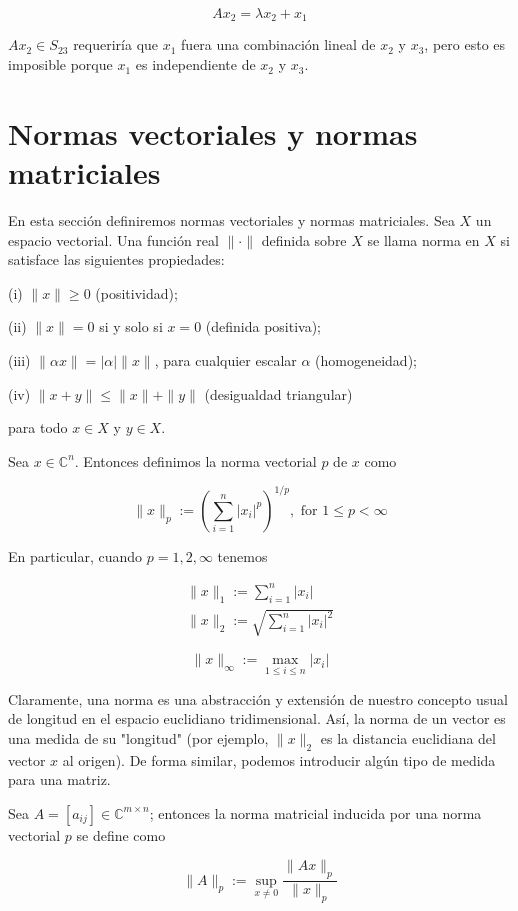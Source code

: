 $$
A x_{2}=\lambda x_{2}+x_{1}
$$

$A x_{2} \in S_{23}$ requeriría que $x_{1}$ fuera una combinación lineal de $x_{2}$ y $x_{3}$, pero esto es imposible porque $x_{1}$ es independiente de $x_{2}$ y $x_{3}$.

\section{Normas vectoriales y normas matriciales}
En esta sección definiremos normas vectoriales y normas matriciales. Sea $X$ un espacio vectorial. Una función real $\|\cdot\|$ definida sobre $X$ se llama norma en $X$ si satisface las siguientes propiedades:

(i) $\|x\| \geq 0$ (positividad);

(ii) $\|x\|=0$ si y solo si $x=0$ (definida positiva);

(iii) $\|\alpha x\|=|\alpha|\|x\|$, para cualquier escalar $\alpha$ (homogeneidad);

(iv) $\|x+y\| \leq\|x\|+\|y\|$ (desigualdad triangular)

para todo $x \in X$ y $y \in X$.

Sea $x \in \mathbb{C}^{n}$. Entonces definimos la norma vectorial $p$ de $x$ como

$$
\|x\|_{p}:=\left(\sum_{i=1}^{n}\left|x_{i}\right|^{p}\right)^{1 / p}, \text { for } 1 \leq p<\infty
$$

En particular, cuando $p=1,2, \infty$ tenemos

$$
\begin{gathered}
\|x\|_{1}:=\sum_{i=1}^{n}\left|x_{i}\right| \\
\|x\|_{2}:=\sqrt{\sum_{i=1}^{n}\left|x_{i}\right|^{2}}
\end{gathered}
$$

$$
\|x\|_{\infty}:=\max _{1 \leq i \leq n}\left|x_{i}\right|
$$

Claramente, una norma es una abstracción y extensión de nuestro concepto usual de longitud en el espacio euclidiano tridimensional. Así, la norma de un vector es una medida de su "longitud" (por ejemplo, $\|x\|_{2}$ es la distancia euclidiana del vector $x$ al origen). De forma similar, podemos introducir algún tipo de medida para una matriz.

Sea $A=\left[a_{i j}\right] \in \mathbb{C}^{m \times n}$; entonces la norma matricial inducida por una norma vectorial $p$ se define como

$$
\|A\|_{p}:=\sup _{x \neq 0} \frac{\|A x\|_{p}}{\|x\|_{p}}
$$

